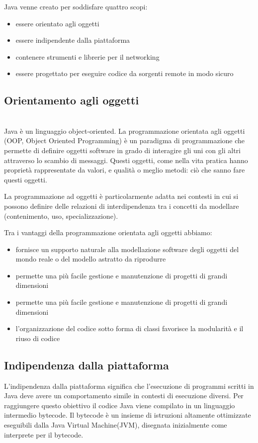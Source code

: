 Java venne creato per soddisfare quattro scopi: 
\begin{itemize}
\item essere orientato agli oggetti
\item essere indipendente dalla piattaforma
\item contenere strumenti e librerie per il networking
\item essere progettato per eseguire codice da sorgenti remote in modo sicuro
\end{itemize}
\subsection*{Orientamento agli oggetti}\\
Java \`e un linguaggio object-oriented. La programmazione orientata agli oggetti (OOP, Object Oriented Programming) \`e un paradigma di programmazione che permette di definire oggetti software in grado di interagire gli uni con gli altri attraverso lo scambio di messaggi.  Questi oggetti, come nella vita pratica hanno propriet\`a rappresentate da valori, e qualit\`a o meglio metodi: 
ci\`o che sanno fare questi oggetti.

La programmazione ad oggetti \`e particolarmente adatta nei contesti in cui si possono definire delle relazioni di interdipendenza tra i concetti da modellare (contenimento, uso, specializzazione). 

Tra i vantaggi della programmazione orientata agli oggetti abbiamo:
\begin{itemize}
\item fornisce un supporto naturale alla modellazione software degli oggetti del mondo reale o del modello astratto da riprodurre
\item permette una pi\`u facile gestione e manutenzione di progetti di grandi dimensioni
\item permette una pi\`u facile gestione e manutenzione di progetti di grandi dimensioni
\item l'organizzazione del codice sotto forma di classi favorisce la modularit\`a e il riuso di codice
\end{itemize}
\subsection*{Indipendenza dalla piattaforma}
L'indipendenza dalla piattaforma significa che l’esecuzione di programmi scritti  in  Java  deve  avere  un  comportamento  simile 
in contesti di esecuzione diversi. Per raggiungere questo obiettivo il codice Java viene compilato in un linguaggio intermedio bytecode. Il bytecode \`e un insieme di istruzioni altamente ottimizzate eseguibili dalla Java Virtual Machine(JVM), disegnata inizialmente come interprete per il bytecode.

